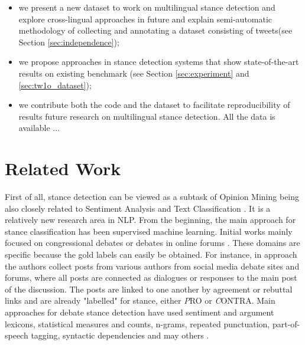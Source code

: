 \documentclass[10pt, a4paper]{article}
\begin{document}
\begin{itemize}
\item we present a new dataset to work on multilingual stance detection and explore cross-lingual approaches in future and explain semi-automatic methodology of collecting and annotating a dataset consisting of tweets(see Section \ref{sec:independence});

\item we propose approaches in stance detection systems that show state-of-the-art results on existing benchmark (see Section \ref{sec:experiment} and \ref{sec:tw1o_dataset});

\item we contribute both the code and the dataset to facilitate reproducibility of results future research on multilingual stance detection. All the data is available ...
\end{itemize}


\section{Related Work}\label{sec_related_work}

First of all, stance detection can be viewed as a subtask of Opinion Mining being also closely related to Sentiment Analysis \cite{pang2008opinion} and Text Classification \cite{aggarwal2012survey}. It is a relatively new research area in NLP. From the beginning, the main approach for stance classification has been supervised machine learning. Initial works mainly focused on congressional debates \cite{Thomas06a} or debates in online forums \cite{somasundaran-wiebe-2009-recognizing,murakami-raymond-2010-support,Anand:2011:CRD:2107653.2107654,walker-etal-2012-stance,hasan-ng-2014-taking,sridhar-etal-2014-collective}. These domains are specific because the gold labels can easily be obtained. For instance, in \cite{sridhar-etal-2014-collective} approach the authors collect posts from various authors from social media debate sites and forums, where all posts are connected as dialogues or responses to the main post of the discussion. The posts are linked to one another by agreement or rebuttal links and are already "labelled" for stance, either {\emph PRO} or {\emph CONTRA}. Main approaches for debate stance detection have used sentiment and argument lexicons, statistical measures and counts, n-grams, repeated punctuation, part-of-speech tagging, syntactic dependencies and may others \cite{Wang8672602}.
\end{document}
